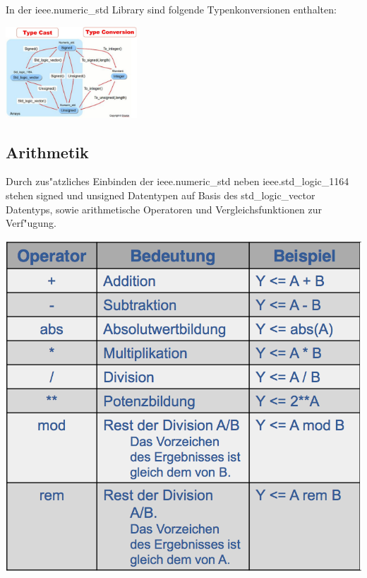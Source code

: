 \begin{multicols}{2}
	In der ieee.numeric\_std Library sind folgende Typenkonversionen enthalten:
	\begin{center}
		\includegraphics[width=0.37\textwidth]{images/typeConversions}
	\end{center}
	\vfill\null
	\columnbreak
	\subsection{Arithmetik}
	\begin{minipage}{0.4\linewidth}
		Durch zus"atzliches Einbinden der ieee.numeric\_std neben ieee.std\_logic\_1164 stehen signed und unsigned Datentypen auf Basis des std\_logic\_vector Datentyps, sowie arithmetische Operatoren und Vergleichsfunktionen zur Verf"ugung.
	\end{minipage}
	\begin{minipage}{0.55\linewidth}
		\includegraphics[width=\linewidth]{images/arithoperator}
	\end{minipage}
\end{multicols}
